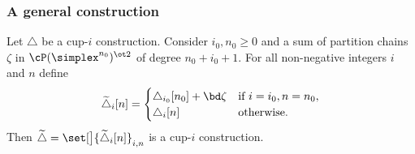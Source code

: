 
\subsubsection{A general construction}

\begin{lemma}
	Let $\triangle$ be a cup-$i$ construction.
	Consider $i_0, n_0 \geq 0$ and a sum of partition chains $\zeta$ in $\cP(\simplex^{n_0})^{\ot 2}$ of degree $n_0+i_0+1$.
	For all non-negative integers $i$ and $n$ define
	\[
	\widetilde\triangle_i[n] =
	\begin{cases}
		\triangle_{i_0}[n_0] + \bd\zeta & \text{if } i=i_0, n=n_0, \\
		\triangle_{i}[n] & \text{otherwise}.
	\end{cases}
	\]
	Then $\widetilde\triangle = \set[\big]{\widetilde\triangle_i[n]}_{i,n}$ is a cup-$i$ construction.
\end{lemma}

